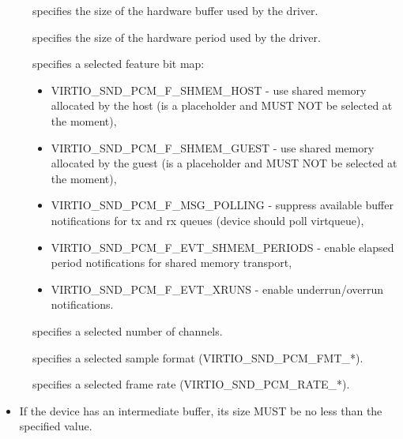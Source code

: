 \begin{description}
\item[] specifies the size of the hardware buffer used by
the driver.
\item[] specifies the size of the hardware period used by
the driver.
\item[] specifies a selected feature bit map:
\begin{itemize}
\item VIRTIO_SND_PCM_F_SHMEM_HOST - use shared memory allocated by the host
(is a placeholder and MUST NOT be selected at the moment),
\item VIRTIO_SND_PCM_F_SHMEM_GUEST - use shared memory allocated by the guest
(is a placeholder and MUST NOT be selected at the moment),
\item VIRTIO_SND_PCM_F_MSG_POLLING - suppress available buffer notifications
for tx and rx queues (device should poll virtqueue),
\item VIRTIO_SND_PCM_F_EVT_SHMEM_PERIODS - enable elapsed period notifications
for shared memory transport,
\item VIRTIO_SND_PCM_F_EVT_XRUNS - enable underrun/overrun notifications.
\end{itemize}
\item[] specifies a selected number of channels.
\item[] specifies a selected sample format (VIRTIO_SND_PCM_FMT_*).
\item[] specifies a selected frame rate (VIRTIO_SND_PCM_RATE_*).
\end{description}


\begin{itemize}
\item If the device has an intermediate buffer, its size MUST be no less than
the specified  value.
\end{itemize}


